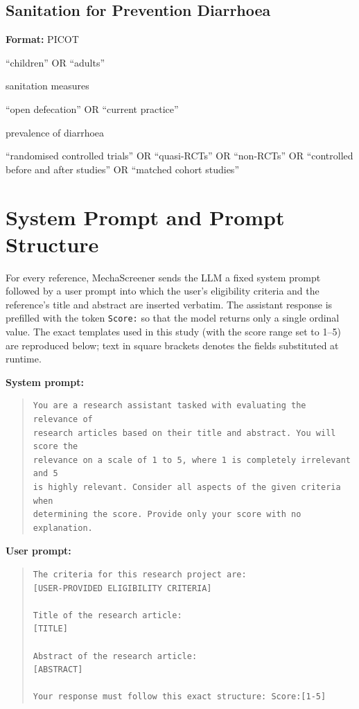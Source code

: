 \documentclass[11pt,a4paper]{article}
\begin{document}
\subsection{Sanitation for Prevention Diarrhoea}
\textbf{Format:} PICOT
\begin{description}[style=nextline]
    \item[Population:] ``children'' OR ``adults''
    \item[Intervention:] sanitation measures
    \item[Comparator:] ``open defecation'' OR ``current practice''
    \item[Outcome:] prevalence of diarrhoea
    \item[Type of study:] ``randomised controlled trials'' OR ``quasi-RCTs'' OR ``non-RCTs'' OR ``controlled before and after studies'' OR ``matched cohort studies''
\end{description}

\section{System Prompt and Prompt Structure}
For every reference, MechaScreener sends the LLM a fixed system prompt followed by a user prompt into which the user's eligibility criteria and the reference's title and abstract are inserted verbatim. The assistant response is prefilled with the token \texttt{Score:} so that the model returns only a single ordinal value. The exact templates used in this study (with the score range set to 1--5) are reproduced below; text in square brackets denotes the fields substituted at runtime.

\vspace{0.5em}
\noindent\textbf{System prompt:}
\begin{quote}
\begin{verbatim}
You are a research assistant tasked with evaluating the relevance of
research articles based on their title and abstract. You will score the
relevance on a scale of 1 to 5, where 1 is completely irrelevant and 5
is highly relevant. Consider all aspects of the given criteria when
determining the score. Provide only your score with no explanation.
\end{verbatim}
\end{quote}

\noindent\textbf{User prompt:}
\begin{quote}
\begin{verbatim}
The criteria for this research project are:
[USER-PROVIDED ELIGIBILITY CRITERIA]

Title of the research article:
[TITLE]

Abstract of the research article:
[ABSTRACT]

Your response must follow this exact structure: Score:[1-5]
\end{verbatim}
\end{quote}
\end{document}
